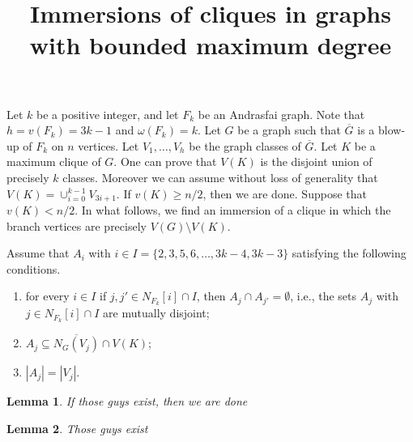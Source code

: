 \documentclass[a4paper,12pt]{article}
\title{Immersions of cliques in graphs with bounded maximum degree}
\newtheorem{lemma}{Lemma}[section]
\begin{document}
\maketitle

Let \(k\) be a positive integer,
and let  \(F_k\) be an Andrasfai graph.
Note that \(h = v(F_k) = 3k-1\) and \(\omega(F_k) = k\).
Let \(G\) be a graph such that \(\overline{G}\) is a blow-up of \(F_k\) on \(n\) vertices.
Let \(V_1,\ldots, V_h\) be the graph classes of \(\overline{G}\).
Let \(K\) be a maximum clique of \(G\).
One can prove that \(V(K)\) is the disjoint union of precisely \(k\) classes.
Moreover we can assume without loss of generality that \(V(K) = \cup_{i=0}^{k-1} V_{3i+1}\).
If \(v(K) \geq n/2\), then we are done.
Suppose that \(v(K) <n/2\). 
In what follows, we find an immersion of a clique in which the branch vertices are precisely \(V(G)\setminus V(K)\).

Assume that \(A_i\) with \(i \in I = \{2,3,5,6,\ldots,3k-4,3k-3\}\)
satisfying the following conditions.
\begin{enumerate}
	\item	for every \(i\in I\) if \(j,j'\in N_{F_k}[i]\cap I\), then \(A_j\cap A_{j'} = \emptyset\), i.e., the sets \(A_j\) with \(j \in N_{F_k}[i]\cap I\) are mutually disjoint;
	\item	\(A_j \subseteq \overline{N_G(V_j)} \cap V(K)\);
	\item	\(|A_j| = |V_j|\).
\end{enumerate}

\begin{lemma}
	If those guys exist, then we are done
\end{lemma}

\begin{lemma}
	Those guys exist
\end{lemma}

%

%
\end{document}

